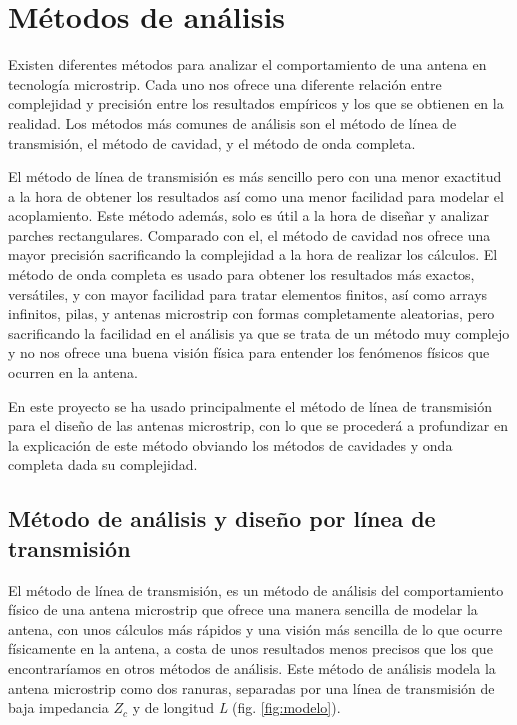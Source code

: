 \section{Métodos de análisis}
\label{analisis}
\par Existen diferentes métodos para analizar el comportamiento de una antena en tecnología microstrip. Cada uno nos ofrece una diferente relación entre complejidad y precisión entre los resultados empíricos y los que se obtienen en la realidad. Los métodos más comunes de análisis son el método  de línea de transmisión, el método de cavidad, y el método de onda completa. 
\\
\par El método de línea de transmisión es más sencillo pero con una menor exactitud a la hora de obtener los resultados así como una menor facilidad para modelar el acoplamiento. Este método además, solo es útil a la hora de diseñar y analizar parches rectangulares. Comparado con el, el método de cavidad nos ofrece una mayor precisión sacrificando la complejidad a la hora de realizar los cálculos. El método de onda completa es usado para obtener los resultados más exactos, versátiles, y con mayor facilidad para tratar elementos finitos, así como arrays infinitos, pilas, y antenas microstrip con formas completamente aleatorias, pero sacrificando la facilidad en el análisis ya que se trata de un método muy complejo y no nos ofrece una buena visión física para entender los fenómenos físicos que ocurren en la antena. 
\\
\par En este proyecto se ha usado principalmente el método de línea de transmisión para el diseño de las antenas microstrip, con lo que se procederá a profundizar en la explicación de este método obviando los métodos de cavidades y onda completa dada su complejidad.

\subsection{Método de análisis y diseño por línea de transmisión}
\label{351}
\par El método de línea de transmisión, es un método de análisis del comportamiento físico de una antena microstrip que ofrece una manera sencilla de modelar la antena, con unos cálculos más rápidos y una visión más sencilla de lo que ocurre físicamente en la antena, a costa de unos resultados menos precisos que los que encontraríamos en otros métodos de análisis. Este método de análisis modela la antena microstrip como dos ranuras, separadas por una línea de transmisión de baja impedancia $Z_{c}$ y de longitud \textit{L} (fig. \ref{fig:modelo}). 
\\

